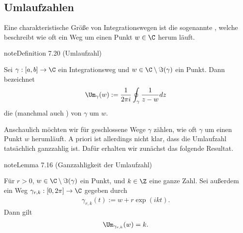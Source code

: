 \documentclass[letterpaper,10pt,german]{jupyterBook}
\begin{document}
\subsection{Umlaufzahlen}
\label{\detokenize{complexanalysis/residuensatz:umlaufzahlen}}
\sphinxAtStartPar
Eine charakteristische Größe von Integrationswegen ist die sogenannte , welche beschreibt wie oft ein Weg um einen Punkt \(w\in\C\) herum läuft.
\label{complexanalysis/residuensatz:definition-8}
\begin{sphinxadmonition}{note}{Definition 7.20 (Umlaufzahl)}



\sphinxAtStartPar
Sei \(\gamma:[a,b]\to\C\) ein Integrationsweg und \(w \in \C \setminus \Im(\gamma)\) ein Punkt.
Dann bezeichnet
\begin{equation*}
\begin{split}\Um_\gamma(w) := 
\frac{1}{2\pi i} \oint_\gamma \frac{1}{z - w} dz\end{split}
\end{equation*}
\sphinxAtStartPar
die  (manchmal auch ) von \(\gamma\) um \(w\).
\end{sphinxadmonition}

\sphinxAtStartPar
Anschaulich möchten wir für geschlossene Wege \(\gamma\) zählen, wie oft \(\gamma\) um einen Punkt \(w\) herumläuft.
A priori ist allerdings nicht klar, dass die Umlaufzahl tatsächlich ganzzahlig ist.
Dafür erhalten wir zunächst das folgende Resultat.
\label{complexanalysis/residuensatz:lemma-9}
\begin{sphinxadmonition}{note}{Lemma 7.16 (Ganzzahligkeit der Umlaufzahl)}



\sphinxAtStartPar
Für \(r>0\), \(w\in\C \setminus \Im(\gamma)\) ein Punkt, und \(k\in\Z\) eine ganze Zahl.
Sei außerdem ein Weg \(\gamma_{r,k}:[0,2\pi]\to\C\) gegeben durch
\begin{equation*}
\begin{split}\gamma_{r,k}(t) := w + r \exp(ikt).\end{split}
\end{equation*}
\sphinxAtStartPar
Dann gilt
\begin{equation*}
\begin{split}\Um_{\gamma_{r,k}}(w) = k.\end{split}
\end{equation*}\end{sphinxadmonition}
\end{document}
